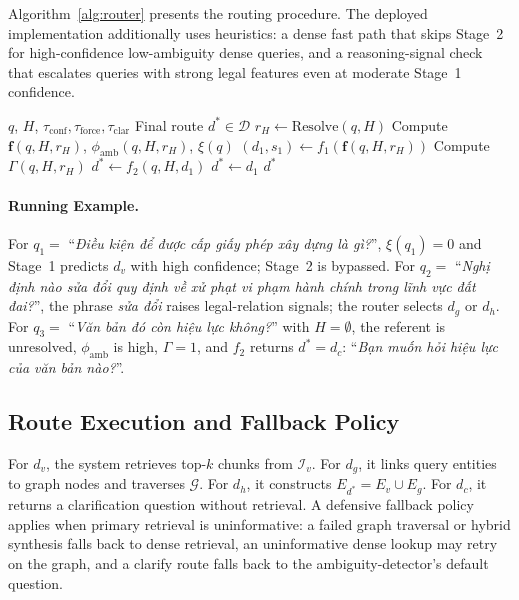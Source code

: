﻿\documentclass[11pt,twocolumn]{article}
\begin{document}
Algorithm~\ref{alg:router} presents the routing procedure. The
deployed implementation additionally uses heuristics: a dense fast
path that skips Stage~2 for high-confidence low-ambiguity dense
queries, and a reasoning-signal check that escalates queries with
strong legal features even at moderate Stage~1 confidence.

\begin{algorithm}[!htbp]
\caption{Two-stage Adaptive Router}
\label{alg:router}
\begin{algorithmic}[1]
\Require $q$, $H$,
    $\tau_{\mathrm{conf}},\tau_{\mathrm{force}},\tau_{\mathrm{clar}}$
\Ensure Final route $d^*\in\mathcal{D}$
\State $r_H\leftarrow\mathrm{Resolve}(q,H)$
\State Compute $\mathbf{f}(q,H,r_H)$,
       $\phi_{\mathrm{amb}}(q,H,r_H)$, $\xi(q)$
\State $(d_1,s_1)\leftarrow f_1(\mathbf{f}(q,H,r_H))$
\State Compute $\Gamma(q,H,r_H)$
  \State $d^*\leftarrow f_2(q,H,d_1)$
\Else
  \State $d^*\leftarrow d_1$
\EndIf
\State \Return $d^*$
\end{algorithmic}
\end{algorithm}

\paragraph{Running Example.}
For $q_1=$ ``\textit{Điều kiện để được cấp giấy phép xây dựng là
gì?}'', $\xi(q_1)=0$ and Stage~1 predicts $d_v$ with high confidence;
Stage~2 is bypassed. For $q_2=$ ``\textit{Nghị định nào sửa đổi quy
định về xử phạt vi phạm hành chính trong lĩnh vực đất đai?}'', the
phrase \textit{sửa đổi} raises legal-relation signals; the router
selects $d_g$ or $d_h$. For $q_3=$ ``\textit{Văn bản đó còn hiệu lực
không?}'' with $H=\emptyset$, the referent is unresolved,
$\phi_{\mathrm{amb}}$ is high, $\Gamma=1$, and $f_2$ returns
$d^*=d_c$: ``\textit{Bạn muốn hỏi hiệu lực của văn bản nào?}''.

\subsection{Route Execution and Fallback Policy}
\label{subsec:route_execution}

For $d_v$, the system retrieves top-$k$ chunks from $\mathcal{I}_v$.
For $d_g$, it links query entities to graph nodes and traverses
$\mathcal{G}$. For $d_h$, it constructs $E_{d^*}=E_v\cup E_g$. For
$d_c$, it returns a clarification question without retrieval. A
defensive fallback policy applies when primary retrieval is
uninformative: a failed graph traversal or hybrid synthesis falls back
to dense retrieval, an uninformative dense lookup may retry on the
graph, and a clarify route falls back to the ambiguity-detector's
default question.
\end{document}
